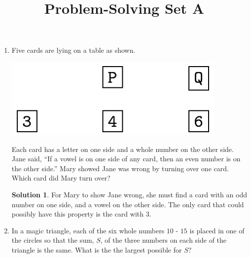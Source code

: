 \documentclass{article}
\title{Problem-Solving Set A}
\author{}
\date{}
\theoremstyle{definition}
\newtheorem*{solution}{Solution}
\begin{document}
\maketitle
\begin{multicols*}{2}
    \begin{enumerate}
        \item Five cards are lying on a table as shown.
            \begin{center}
                \includegraphics[scale=0.25]{5-2_cards.png}
            \end{center}
            Each card has a letter on one side and a whole number on the other side.
            Jane said, ``If a vowel is on one side of any card, then an even number is on the other side.''
            Mary showed Jane was wrong by turning over one card.
            Which card did Mary turn over?
            \begin{solution}
                For Mary to show Jane wrong, she must find a card with an odd number on one side, and a vowel on the other side.
                The only card that could possibly have this property is the card with $3$.
            \end{solution}
        \item In a magic triangle, each of the six whole numbers $10$ - $15$ is placed in one of the circles so that the sum, $S$, of the three numbers on each side of the triangle is the same.
            What is the the largest possible for $S$?
            \begin{center}
\end{center}
\end{enumerate}
\end{multicols*}
\end{document}
